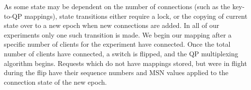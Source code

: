 As some state may be dependent on the number of connections (such as
the key-to-QP mappings), state transitions either require a lock, or
the copying of current state over to a new epoch when new connections
are added. In all of our experiments only one such transition is
made. We begin our mapping after a specific number of clients for the
experiment have connected. Once the total number of clients have
connected, a switch is flipped, and the QP multiplexing algorithm
begins. Requests which do not have mappings stored, but were in flight
during the flip have their sequence numbers and MSN values applied to
the connection state of the new epoch.











